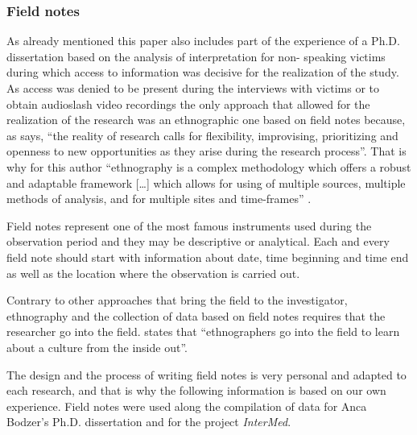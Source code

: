 \documentclass[output=paper]{LSP/langsci}
\begin{document}
\subsubsection{Field notes}
\largerpage[-1]
As already mentioned this paper also includes part of the experience of a Ph.D. dissertation based on the analysis of interpretation for non- speaking  victims during which access to information was decisive for the realization of the study. As access was denied to be present during the interviews with victims or to obtain audioslash video recordings the only approach that allowed for the realization of the research was an ethnographic one based on field notes because, as \citet[12]{Koskinen2008} says, ``the reality of research calls for flexibility, improvising, prioritizing and openness to new opportunities as they arise during the research process''. That is why for this author ``ethnography is a complex methodology which offers a robust and adaptable framework [\ldots ] which allows for using of multiple sources, multiple methods of analysis, and for multiple sites and time-frames'' \citep[6]{Koskinen2008}.

Field notes represent one of the most famous instruments used during the observation period and they may be descriptive or analytical.  Each and every field note should start with information about date, time beginning and time end as well as the location where the observation is carried out. 

Contrary to other approaches that bring the field to the investigator, ethnography and the collection of data based on field notes requires that the researcher go into the field. \citet[3--4]{Schwartzmann1993} states that ``ethnographers go into the field to learn about a culture from the inside out''.

The design and the process of writing field notes is very personal and adapted to each research, and that is why the following information is based on our own experience. Field notes were used along the compilation of data for Anca Bodzer's Ph.D. dissertation and for the project \textit{InterMed}.
\end{document}
